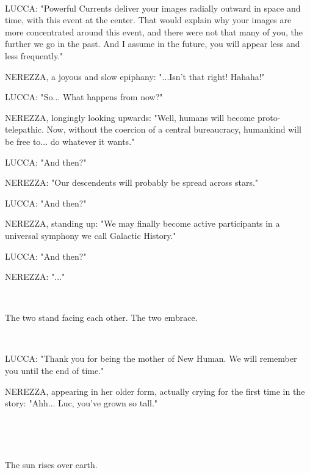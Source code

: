 \documentclass[11pt]{article}
\begin{document}
\ 

LUCCA: "Powerful Currents deliver your images radially outward in space and time, with this event at the center.
That would explain why your images are more concentrated around this event, and there were not that many of you, the further we go in the past.
And I assume in the future, you will appear less and less frequently."

NEREZZA, a joyous and slow epiphany: "...Isn't that right! Hahaha!"

LUCCA: "So... What happens from now?"

NEREZZA, longingly looking upwards: "Well, humans will become proto-telepathic. 
Now, without the coercion of a central bureaucracy, humankind will be free to... do whatever it wants."

LUCCA: "And then?"

NEREZZA: "Our descendents will probably be spread across stars."

LUCCA: "And then?"

NEREZZA, standing up: "We may finally become active participants in a universal symphony we call Galactic History."

LUCCA: "And then?"

NEREZZA: "..."

\ 

The two stand facing each other.
The two embrace. 

\ 

LUCCA: "Thank you for being the mother of New Human.
We will remember you until the end of time."

NEREZZA, appearing in her older form, actually crying for the first time in the story: "Ahh... Luc, you've grown so tall."

\ 

\ 

The sun rises over earth.
\end{document}
